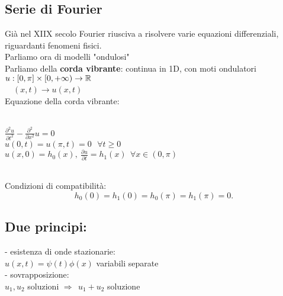 \documentclass{article}
\begin{document}
	\subsection{Serie di Fourier}
	Già nel XIIX secolo Fourier riusciva a risolvere varie equazioni differenziali, riguardanti fenomeni fisici.\\
	Parliamo ora di modelli "ondulosi"\\
	Parliamo della \textbf{corda vibrante}: continua in 1D, con moti ondulatori\\
	$u:[0,\pi] \times [0,+\infty)\rightarrow\mathbb{R}$\\
	\text{}\ \ $(x, t) \rightarrow u(x,t)$\\
	Equazione della corda vibrante:
	\begin{cases}\\
		$\frac{\partial ^2 u}{\partial t^2} - \frac{\partial ^2}{\partial x^2}u = 0$\\
	$u(0,t) = u(\pi,t) = 0 \ \ \ \forall t \geq 0$\\
	$u(x,0) = h_0(x), \ \frac{\partial u}{\partial t} = h_1(x) \ \ \forall x\in (0,\pi)$
	\end{cases}\\
	Condizioni di compatibilità:
	\[
	h_0(0) = h_1(0) = h_0(\pi) = h_1(\pi) = 0
	.\] \newpage
	\subsection{Due principi:}
	- esistenza di onde stazionarie:\\
	$u(x,t) = \psi(t)\phi(x)$ variabili separate\\
	- sovrapposizione: \\
	$u_1,u_2$ soluzioni $ \Rightarrow \ \ u_1 + u_2$ soluzione\\
\end{document}
